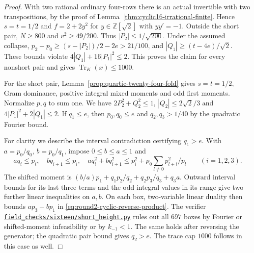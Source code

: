 \documentclass[11pt,reqno]{amsart}
\newcommand{\codefile}[1]{\href{https://github.com/sebastienpalcoux/grothendieck-ring-classification/blob/d5750105bb5758f3ad38d2e5464dfcc12c019816/supplements/rank6/sphericality/#1}{\nolinkurl{#1}}}
\theoremstyle{remark}\newtheorem{remark}[theorem]{Remark}
\numberwithin{equation}{section}
\begin{document}
\begin{proof}
With two rational ordinary four-rows there is an actual invertible with two transpositions, by the proof of Lemma~\ref{thm:cyclic16-irrational-finite}. Hence $s=t=1/2$ and $f=2+2y^2$ for $y\in\mathbb Z[\sqrt2]$ with $yy'=-1$. Outside the short pair, $N\ge800$ and $v^2\ge49/200$. Thus $|P_2|\le1/\sqrt{200}$. Under the assumed collapse, $p_2-p_0\ge (s-|P_2|)/2-2e>21/100$, and $|Q_1|\ge(t-4e)/\sqrt2$. These bounds violate $4|Q_1|+16|P_1|^2\le2$. This proves the claim for every nonshort pair and gives $\operatorname{Tr}_K(x)\le1000$.

For the short pair, Lemma~\ref{prop:quartic-twenty-four-fold} gives
$s=t=1/2$, Gram dominance, positive integral mixed moments and odd
first moments. Normalize $p,q$ to sum one. We have
$2P_2^2+Q_2^2\le1$, $|Q_2|\le2\sqrt2/3$ and
$4|P_1|^2+2|Q_1|\le2$. If $q_1\le e$, then $p_0,q_0\le e$ and
$q_2,q_3>1/40$ by the quadratic Fourier bound.

For clarity we describe the interval contradiction certifying $q_1>e$. With $a=p_0/q_0$, $b=p_0/q_1$, impose $0\le b\le a\le1$ and
\[
 a q_i\le p_i,\quad b q_{i+1}\le p_i,\quad
 a q_i^2+bq_{i+1}^2\le p_i^2+p_0\sum_{l\ne0}p_{l+i}^2/p_l
 \qquad (i=1,2,3).
\]
The shifted moment is $(b/a)p_1+q_1p_2/q_2+q_2p_3/q_3+q_3a$. Outward interval bounds for its last three terms and the odd integral values in its range give two further linear inequalities on $a,b$. On each box, two-variable linear duality then bounds $ap_3+bp_1$ in \eqref{eq:round2-cyclic-reverse-product}. The verifier \codefile{field_checks/sixteen/short_height.py} rules out all $697$ boxes by Fourier or shifted-moment infeasibility or by $k_{-1}<1$. The same holds after reversing the generator; the quadratic pair bound gives $q_2>e$. The trace cap $1000$ follows in this case as well.


\end{proof}
\end{document}
